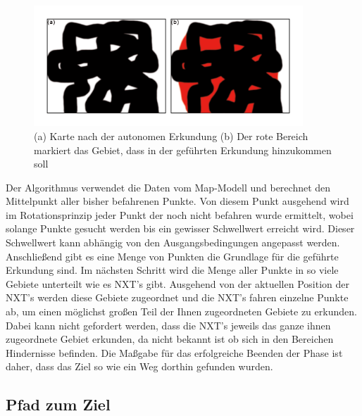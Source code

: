 \begin{figure}[ht]
    \centering
  \includegraphics[width=0.9\textwidth, angle=0]{img/guided_exploration_1.png}
    \caption{(a) Karte nach der autonomen Erkundung (b) Der rote Bereich markiert das Gebiet, dass in der geführten Erkundung hinzukommen soll}
    \label{guidedexploration}
\end{figure}

Der Algorithmus verwendet die Daten vom Map-Modell und berechnet den Mittelpunkt aller bisher befahrenen Punkte. Von diesem Punkt ausgehend wird im Rotationsprinzip jeder Punkt der noch nicht befahren wurde ermittelt, wobei solange Punkte gesucht werden bis ein gewisser Schwellwert erreicht wird. Dieser Schwellwert kann abhängig von den Ausgangsbedingungen angepasst werden. Anschließend gibt es eine Menge von Punkten die Grundlage für die geführte Erkundung sind. Im nächsten Schritt wird die Menge aller Punkte in so viele Gebiete unterteilt wie es NXT's gibt. Ausgehend von der aktuellen Position der NXT's werden diese Gebiete zugeordnet und die NXT's fahren einzelne Punkte ab, um einen möglichst großen Teil der Ihnen zugeordneten Gebiete zu erkunden. Dabei kann nicht gefordert werden, dass die NXT's jeweils das ganze ihnen zugeordnete Gebiet erkunden, da nicht bekannt ist ob sich in den Bereichen Hindernisse befinden. Die Maßgabe für das erfolgreiche Beenden der Phase ist daher, dass das Ziel so wie ein Weg dorthin gefunden wurden. 

\subsection{Pfad zum Ziel}

